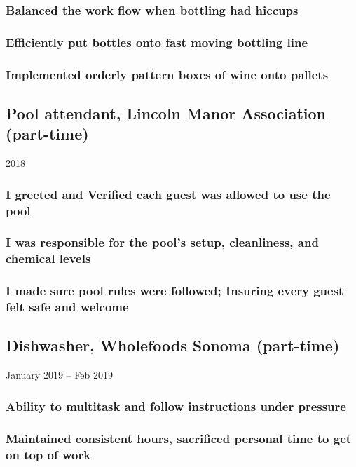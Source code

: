 \documentclass{article}
\begin{document}
		\subsubsection{Balanced the work flow when bottling had hiccups}
		\subsubsection{Efficiently put bottles onto fast moving bottling line}
		\subsubsection{Implemented orderly pattern boxes of wine onto pallets}

	\subsection{Pool attendant, Lincoln Manor Association (part-time)} 2018
		\vspace{-2mm}

		\subsubsection{I greeted and Verified each guest was allowed to use the pool}
		\subsubsection{I was responsible for the pool's setup, cleanliness, and chemical levels}
		\subsubsection{I made sure pool rules were followed; Insuring every guest felt safe and welcome}

	\subsection{Dishwasher, Wholefoods Sonoma (part-time)} January 2019 – Feb 2019
		\vspace{-2mm}
		\subsubsection{Ability to multitask and follow instructions under pressure}
		\subsubsection{Maintained consistent hours, sacrificed personal time to get on top of work}
\end{document}
